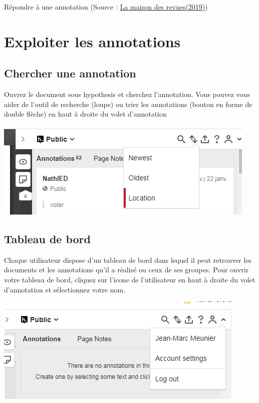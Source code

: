 \documentclass[
]{book}
\begin{document}
Répondre à une annotation (Source : \href{http://www.maisondesrevues.org/1182}{La maison des revues(2019)})

\hypertarget{s7}{%
\chapter{Exploiter les annotations}\label{s7}}

\hypertarget{s71}{%
\section{Chercher une annotation}\label{s71}}

Ouvrez le document sous hypothesis et cherchez l'annotation. Vous pouvez vous aider de l'outil de recherche (loupe) ou trier les annotations (bouton en forme de double flèche) en haut à droite du volet d'annotation

\includegraphics{img/sort.png}

\hypertarget{tableau-de-bord}{%
\section{Tableau de bord}\label{tableau-de-bord}}

Chaque utilisateur dispose d'un tableau de bord dans lequel il peut retrouver les documents et les annotations qu'il a réalisé ou ceux de ses groupes. Pour ouvrir votre tableau de bord, cliquez sur l'icone de l'utilisateur en haut à droite du volet d'annotation et sélectionnez votre nom.

\includegraphics{img/login.png}
\end{document}
